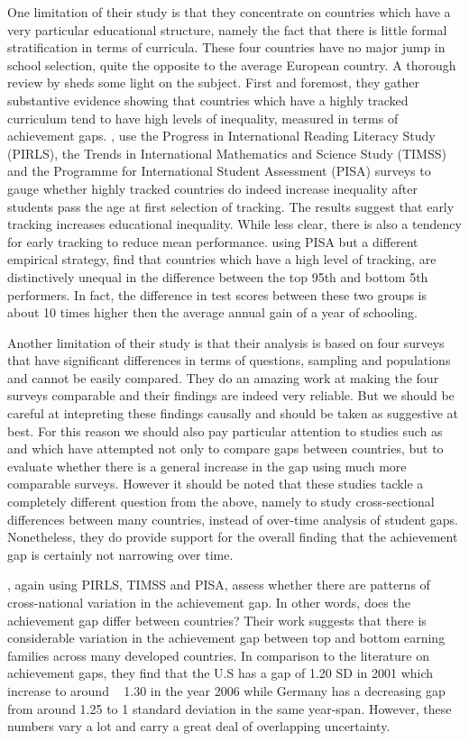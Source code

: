 \documentclass[11pt, a4paper]{article}\usepackage[]{graphicx}\usepackage[]{color}
\begin{document}
One limitation of their study is that they concentrate on countries which have a very particular educational structure, namely the fact that there is little formal stratification in terms of curricula. These four countries have no major jump in school selection, quite the opposite to the average European country. A thorough review by \citet{werfhorst_mijs} sheds some light on the subject. First and foremost, they gather substantive evidence showing that countries which have a highly tracked curriculum tend to have high levels of inequality, measured in terms of achievement gaps. \citet{hanushek_woesmann_tracking}, use the Progress in International Reading Literacy Study (PIRLS), the Trends in International Mathematics and Science Study (TIMSS) and the Programme for International Student Assessment (PISA) surveys to gauge whether highly tracked countries do indeed increase inequality after students pass the age at first selection of tracking. The results suggest that early tracking increases educational inequality. While less clear, there is also a tendency for early tracking to reduce mean performance. \citet{micklewright} using PISA but a different empirical strategy, find that countries which have a high level of tracking, are distinctively unequal in the difference between the top 95th and bottom 5th performers. In fact, the difference in test scores between these two groups is about 10 times higher then the average annual gain of a year of schooling.

Another limitation of their study is that their analysis is based on four surveys that have significant differences in terms of questions, sampling and populations and cannot be easily compared. They do an amazing work at making the four surveys comparable and their findings are indeed very reliable.  But we should be careful at intepreting these findings causally and should be taken as suggestive at best. For this reason we should also pay particular attention to studies such as \citet{anna2016} and \citet{anna2016_global} which have attempted not only to compare gaps between countries, but to evaluate whether there is a general increase in the gap using much more comparable surveys. However it should be noted that these studies tackle a completely different question from the above, namely to study cross-sectional differences between many countries, instead of over-time analysis of student gaps. Nonetheless, they do provide support for the overall finding that the achievement gap is certainly not narrowing over time.

\citet{anna2016}, again using PIRLS, TIMSS and PISA, assess whether there are patterns of cross-national variation in the achievement gap. In other words, does the achievement gap differ between countries? Their work suggests that there is considerable variation in the achievement gap between top and bottom earning families across many developed countries. In comparison to the literature on achievement gaps, they find that the U.S has a gap of   1.20 SD in 2001 which increase to around ~ 1.30 in the year 2006 while Germany has a decreasing gap from around   1.25 to   1 standard deviation in the same year-span. However, these numbers vary a lot and carry a great deal of overlapping uncertainty.
\end{document}
